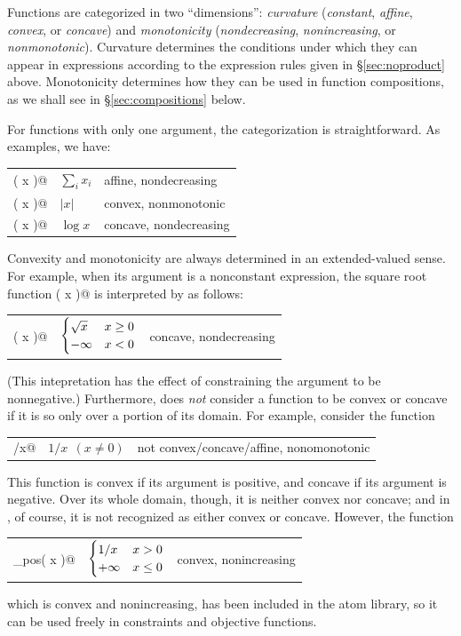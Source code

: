 \documentclass[12pt]{article}
\begin{document}
Functions are categorized in
two ``dimensions'': \emph{curvature}
(\emph{constant}, \emph{affine},
\emph{convex}, or \emph{concave}) and
\emph{monotonicity}
(\emph{nondecreasing}, \emph{nonincreasing}, or \emph{nonmonotonic}).
Curvature determines the conditions
under which they can appear in expressions according to the
expression rules given in \S\ref{sec:noproduct} above.
Monotonicity determines
how they can be used in function  compositions, 
as we shall see in \S\ref{sec:compositions} below.

For functions with only one argument, the categorization is 
straightforward.  As examples, we have:
\begin{center}
\begin{tabular}{lll}
	\verb@sum( x )@ & $\sum_i x_i$ & affine, nondecreasing \\
	\verb@abs( x )@ & $|x|$ & convex, nonmonotonic \\
	\verb@log( x )@ & $\log x$ & concave, nondecreasing
\end{tabular}
\end{center}
Convexity and monotonicity are always determined in an 
extended-valued sense.
For example, when its argument is a nonconstant
\cvx expression, the square root function \verb@sqrt( x )@ is
interpreted by \cvx as follows:
\begin{center}
\begin{tabular}{lll}
	\verb@sqrt( x )@ & $\begin{cases} \sqrt{x}&x\geq 0\\-\infty&x<0 \end{cases}$ & concave, nondecreasing \\
\end{tabular}
\end{center}
(This intepretation has the effect of constraining the argument \verb@x@
to be nonnegative.) Furthermore, \cvx does \emph{not} consider a function to be
convex or concave if it is so only over a portion of its domain. 
For example, consider the function
\begin{center}
\begin{tabular}{lll}
	\verb@1/x@ & $1/x~~(x\neq 0)$ & not convex/concave/affine, nonomonotonic
\end{tabular}
\end{center}
This function is convex if its argument is positive, and
concave if its argument is negative.  Over its whole domain, though,
it is neither convex nor concave;
and in \cvx, of course, it is not recognized as either convex or 
concave.
However, the function
\begin{center}
\begin{tabular}{lll}
	\verb@inv_pos( x )@ & $\begin{cases} 1/x &x>0\\+\infty&x\leq 0 \end{cases}$ & convex, nonincreasing
\end{tabular}
\end{center}
which is convex and nonincreasing,
has been included in the atom library,
so it can be used freely in constraints
and objective functions.
\end{document}
